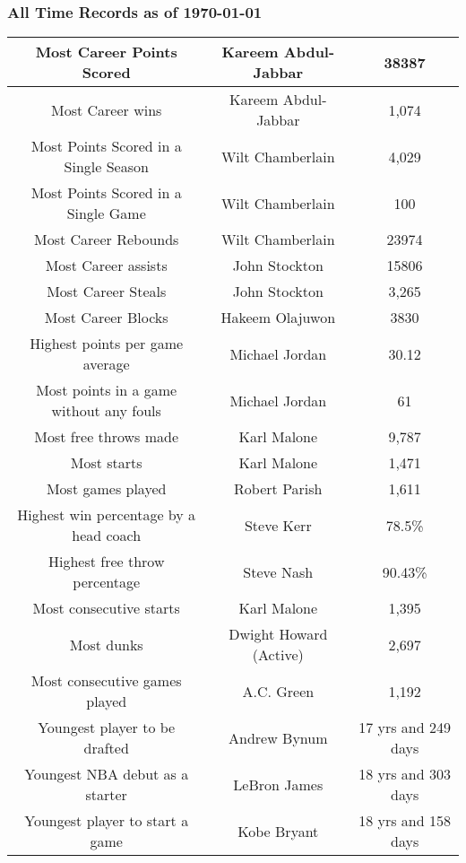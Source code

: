 \documentclass[12pt]{book}
\begin{document}
			\subsubsection{All Time Records as of \today}
			\begin{center}
				\begin{tabular}{|c|c|c|}
					\hline
					Most Career Points Scored & Kareem Abdul-Jabbar & 38387 \\
					\hline
					 Most Career wins & Kareem Abdul-Jabbar & 1,074 \\
					\hline			
					Most Points Scored in a Single Season &  Wilt Chamberlain & 4,029 \\
					\hline
					Most Points Scored in a Single Game & Wilt Chamberlain & 100 \\
					\hline
					Most Career Rebounds & Wilt Chamberlain & 23974 \\
					\hline
					Most Career assists & John Stockton & 15806 \\
					\hline
					Most Career Steals & John Stockton & 3,265 \\
					\hline
					Most Career Blocks & Hakeem Olajuwon & 3830 \\
					\hline
					Highest points per game average & Michael Jordan & 30.12 \\
					\hline
				    Most points in a game without any fouls & Michael Jordan & 61 \\
				    \hline
				    Most free throws made & Karl Malone & 9,787 \\
				    \hline
			        Most starts & Karl Malone & 1,471 \\
			        \hline
			        Most games played & Robert Parish & 1,611 \\
			        \hline
			        Highest win percentage by a head coach& Steve Kerr & 78.5\% \\
			        \hline
		            Highest free throw percentage & Steve Nash & 90.43\%  \\
		            \hline
			        Most consecutive starts & Karl Malone & 1,395\\
			        \hline
		            Most dunks & Dwight Howard (Active) & 2,697 \\
			        \hline
		            Most consecutive games played & A.C. Green &  1,192 \\
		            \hline
		            Youngest player to be drafted & Andrew Bynum & 17 yrs and 249 days \\
		            \hline
		            Youngest NBA debut as a starter & LeBron James& 18 yrs and 303 days \\
		            \hline
	                Youngest player to start a game & Kobe Bryant & 18 yrs and 158 days \\
	                \hline	                
	                
	                
	                
		            
				      
				\end{tabular}	
			
			
			
			
			\end{center}		
\end{document}
